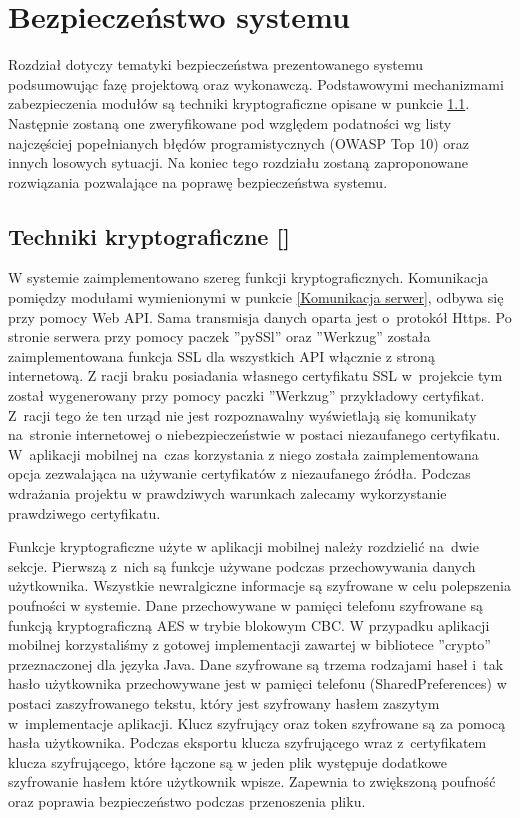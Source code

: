 \newpage
\section{Bezpieczeństwo systemu \textsl{\NazwaSys}} \label{sec:bezpieczenstwo}
Rozdział dotyczy tematyki bezpieczeństwa prezentowanego systemu podsumowując fazę projektową oraz wykonawczą. Podstawowymi mechanizmami zabezpieczenia modułów są techniki kryptograficzne opisane w punkcie \ref{sec:techniki kryptograficzne}. Następnie zostaną one zweryfikowane pod względem podatności wg listy najczęściej popełnianych błędów programistycznych (OWASP Top 10) oraz innych losowych sytuacji. Na koniec tego rozdziału zostaną zaproponowane rozwiązania pozwalające na poprawę bezpieczeństwa systemu.

\subsection{Techniki kryptograficzne [\StudentB]}\label{sec:techniki kryptograficzne}
W systemie \textsl{\NazwaSys} zaimplementowano szereg funkcji kryptograficznych. Komunikacja pomiędzy modułami wymienionymi w punkcie \ref{Komunikacja serwer}, odbywa się przy pomocy Web API. Sama transmisja danych oparta jest o~protokół Https. Po stronie serwera przy pomocy paczek ''pySSl'' oraz ''Werkzug'' została zaimplementowana funkcja SSL dla wszystkich API włącznie z stroną internetową. Z racji braku posiadania własnego certyfikatu SSL w~projekcie tym został wygenerowany przy pomocy paczki ''Werkzug'' przykładowy certyfikat. Z~racji tego że ten urząd nie jest rozpoznawalny wyświetlają się komunikaty na~stronie internetowej o niebezpieczeństwie w postaci niezaufanego certyfikatu. W~aplikacji mobilnej na~czas korzystania z niego została zaimplementowana opcja zezwalająca na używanie certyfikatów z niezaufanego źródła. Podczas wdrażania projektu w prawdziwych warunkach zalecamy wykorzystanie prawdziwego certyfikatu.

Funkcje kryptograficzne użyte w aplikacji mobilnej należy rozdzielić na~dwie sekcje. Pierwszą z~nich są funkcje używane podczas przechowywania danych użytkownika. Wszystkie newralgiczne informacje są szyfrowane w celu polepszenia poufności w systemie. Dane przechowywane w pamięci telefonu szyfrowane są funkcją kryptograficzną AES w trybie blokowym CBC. W przypadku aplikacji mobilnej korzystaliśmy z gotowej implementacji zawartej w bibliotece ''crypto'' przeznaczonej dla języka Java. Dane szyfrowane są trzema rodzajami haseł i~tak hasło użytkownika przechowywane jest w pamięci telefonu (SharedPreferences) w postaci zaszyfrowanego tekstu, który jest szyfrowany hasłem zaszytym w~implementacje aplikacji. Klucz szyfrujący oraz token szyfrowane są za pomocą hasła użytkownika. Podczas eksportu klucza szyfrującego wraz z~certyfikatem klucza szyfrującego, które łączone są w jeden plik   występuje dodatkowe szyfrowanie hasłem które użytkownik wpisze. Zapewnia to zwiększoną poufność oraz poprawia bezpieczeństwo podczas przenoszenia pliku.                

